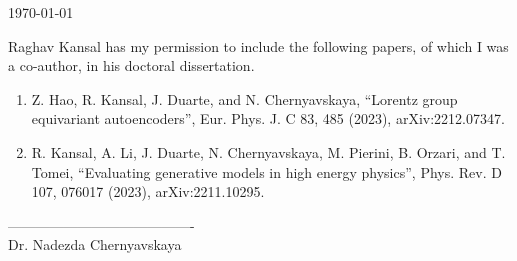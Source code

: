\documentclass{article}
\begin{document}
\today

Raghav Kansal has my permission to include the following papers, of which
I was a co-author, in his doctoral dissertation.

\begin{enumerate}
    \item Z. Hao, R. Kansal, J. Duarte, and N. Chernyavskaya, “Lorentz group equivariant autoencoders”, Eur. Phys. J. C 83, 485 (2023), arXiv:2212.07347.
    \item R. Kansal, A. Li, J. Duarte, N. Chernyavskaya, M. Pierini, B. Orzari, and T. Tomei, “Evaluating generative models in high energy physics”, Phys. Rev. D 107, 076017 (2023), arXiv:2211.10295.
\end{enumerate}

\baselineskip
----------------------------------------\\
Dr. Nadezda Chernyavskaya
\end{document}
